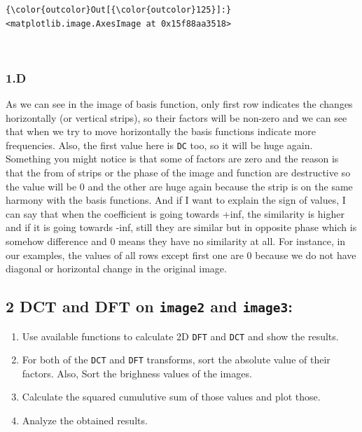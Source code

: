 \documentclass[11pt]{article}
\providecommand{\tightlist}{%
      \setlength{\itemsep}{0pt}\setlength{\parskip}{0pt}}
\begin{document}
\begin{Verbatim}[commandchars=\\\{\}]
{\color{outcolor}Out[{\color{outcolor}125}]:} <matplotlib.image.AxesImage at 0x15f88aa3518>
\end{Verbatim}
            
    \begin{center}
    \end{center}
    { \hspace*{\fill} \\}
    
    \hypertarget{d}{%
\subsubsection{1.D}\label{d}}

As we can see in the image of basis function, only first row indicates
the changes horizontally (or vertical strips), so their factors will be
non-zero and we can see that when we try to move horizontally the basis
functions indicate more frequencies. Also, the first value here is
\texttt{DC} too, so it will be huge again. Something you might notice is
that some of factors are zero and the reason is that the from of strips
or the phase of the image and function are destructive so the value will
be 0 and the other are huge again because the strip is on the same
harmony with the basis functions. And if I want to explain the sign of
values, I can say that when the coefficient is going towards +inf, the
similarity is higher and if it is going towards -inf, still they are
similar but in opposite phase which is somehow difference and 0 means
they have no similarity at all. For instance, in our examples, the
values of all rows except first one are 0 because we do not have
diagonal or horizontal change in the original image.

    \hypertarget{dct-and-dft-on-image2-and-image3}{%
\subsection{\texorpdfstring{2 DCT and DFT on \texttt{image2} and
\texttt{image3}:}{2 DCT and DFT on image2 and image3:}}\label{dct-and-dft-on-image2-and-image3}}

\begin{enumerate}
\def\labelenumi{\arabic{enumi}.}
\tightlist
\item
  Use available functions to calculate 2D \texttt{DFT} and \texttt{DCT}
  and show the results.
\item
  For both of the \texttt{DCT} and \texttt{DFT} transforms, sort the
  absolute value of their factors. Also, Sort the brighness values of
  the images.
\item
  Calculate the squared cumulutive sum of those values and plot those.
\item
  Analyze the obtained results.
\end{enumerate}
\end{document}
